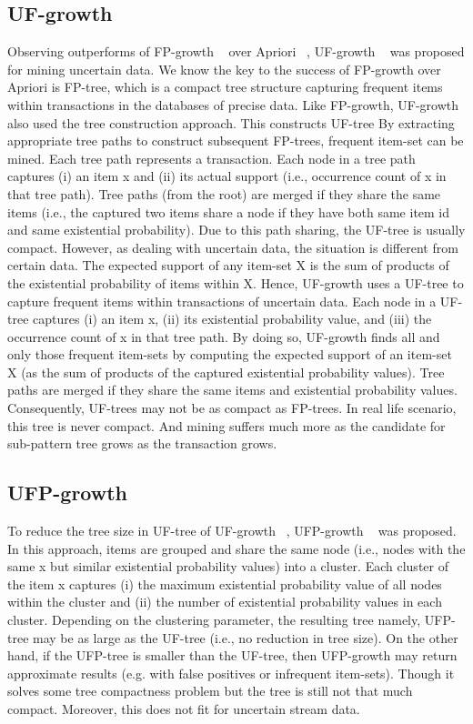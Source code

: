     \subsection{UF-growth}
    Observing outperforms of FP-growth ~\cite{fp_growth} over Apriori ~\cite{apriori}, UF-growth ~\cite{uf_growth} was proposed for mining uncertain data. We know the key to the success of FP-growth over Apriori is FP-tree, which is a compact tree structure capturing frequent items within transactions in the databases of precise data. Like FP-growth, UF-growth also used the tree construction approach. This constructs UF-tree By extracting appropriate tree paths to construct subsequent FP-trees, frequent item-set can be mined. Each tree path represents a transaction. Each node in a tree path captures (i) an item x and (ii) its actual support (i.e., occurrence count of x in that tree path). Tree paths (from the root) are merged if they share the same items (i.e., the captured two items share a node if they have both same item id and same existential probability). Due to this path sharing, the UF-tree is usually compact. However, as dealing with uncertain data, the situation is different from certain data. The expected support of any item-set X is the sum of products of the existential probability of items within X. Hence, UF-growth uses a UF-tree to capture frequent items within transactions of uncertain data. Each node in a UF-tree captures (i) an item x, (ii) its existential probability value, and (iii) the occurrence count of x in that tree path. By doing so, UF-growth ﬁnds all and only those frequent item-sets by computing the expected support of an item-set X (as the sum of products of the captured existential probability values). Tree paths are merged if they share the same items and existential probability values. Consequently, UF-trees may not be as compact as FP-trees. In real life scenario, this tree is never compact. And mining suffers much more as the candidate for sub-pattern tree grows as the transaction grows.
    
    \subsection{UFP-growth}
    To reduce the tree size in UF-tree of UF-growth ~\cite{uf_growth}, UFP-growth ~\cite{ufp_growth} was proposed. In this approach, items are grouped and share the same node (i.e., nodes with the same x but similar existential probability values) into a cluster. Each cluster of the item x captures (i) the maximum existential probability value of all nodes within the cluster and (ii) the number of existential probability values in each cluster. Depending on the clustering parameter, the resulting tree namely, UFP-tree may be as large as the UF-tree (i.e., no reduction in tree size). On the other hand, if the UFP-tree  is smaller than the UF-tree, then UFP-growth may return approximate results (e.g. with false positives or infrequent item-sets). Though it solves some tree compactness problem but the tree is still not that much compact. Moreover, this does not fit for uncertain stream data. 
    
